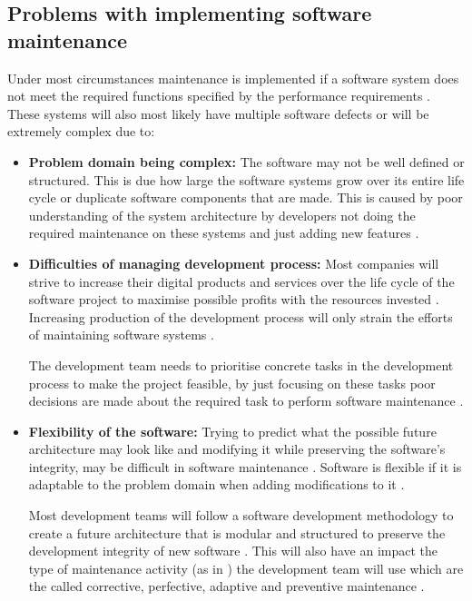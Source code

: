 \subsection{Problems with implementing software maintenance}\label{sec:Maintenance_problems}

Under most circumstances maintenance is implemented if a software system does not meet the required functions specified by the performance requirements \cite{Ogheneovo2014, Sneed2004}. These systems will also most likely have multiple software defects or will be extremely complex due to:

\begin{itemize}
	\item \textbf{Problem domain being complex:} The software may not be well defined or structured. This is due how large the software systems grow over its entire life cycle or duplicate software components that are made. This is caused by poor understanding of the system architecture by developers not doing the required maintenance on these systems and just adding new features \cite{Galster2019, Booch1986}.
	\item \textbf{Difficulties of managing development process:} Most companies will strive to increase their digital products and services over the life cycle of the software project to maximise possible profits with the resources invested \cite{Niu2018}. Increasing production of the development process will only strain the efforts of maintaining software systems \cite{Sneed2004}.\par The development team needs to prioritise concrete tasks in the development process to make the project feasible, by just focusing on these tasks poor decisions are made about the required task to perform software maintenance \cite{Galster2019, Ogheneovo2014, Lenarduzzi2017}. 
	\item \textbf{Flexibility of the software:} Trying to predict what the possible future architecture may look like and modifying it while preserving the software's integrity, may be difficult in software maintenance \cite{Garlan1999}. Software is flexible if it is adaptable to the problem domain when adding modifications to it \cite{Ogheneovo2014}.\par Most development teams will follow a software development methodology to create a future architecture that is modular and structured to preserve the development integrity of new software \cite{Vijayasarathy2016, Rehman2018}. This will also have an impact the type of maintenance activity (as in ) the development team will use which are the called corrective, perfective, adaptive and preventive maintenance \cite{FrancisThamburaj2017, Hasan2012, Stojanov2017, Snipes2018}.

\end{itemize}
